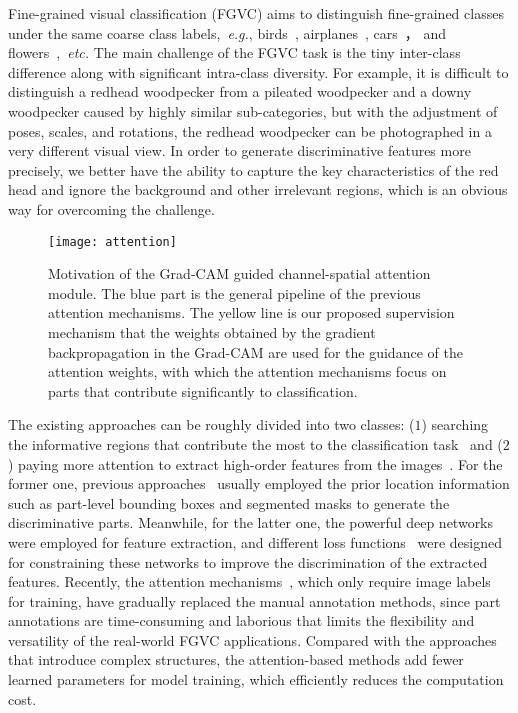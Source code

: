 \documentclass{article}
\begin{document}
Fine-grained visual classification (FGVC) aims to distinguish fine-grained classes under the same coarse class labels,~\emph{e.g.}, birds~\cite{birds}, airplanes~\cite{air}, cars~\cite{cars}， and flowers~\cite{flowers},~\emph{etc.} The main challenge of the FGVC task is the tiny inter-class difference along with significant intra-class diversity. For example, it is difficult to distinguish a redhead woodpecker from a pileated woodpecker and a downy woodpecker caused by highly similar sub-categories, but with the adjustment of poses, scales, and rotations, the redhead woodpecker can be photographed in a very different visual view. In order to generate discriminative features more precisely, we better have the ability to capture the key characteristics of the red head and ignore the background and other irrelevant regions, which is an obvious way for overcoming the challenge. 

\begin{figure}
	\centering 
	\texttt{[image: attention]}  
	\vspace{-6mm}
	\caption{Motivation of the Grad-CAM guided channel-spatial attention module. The blue part is the general pipeline of the previous attention mechanisms. The yellow line is our proposed supervision mechanism that the weights obtained by the gradient backpropagation in the Grad-CAM are used for the guidance of the attention weights, with which the attention mechanisms focus on parts that contribute significantly to classification.}\label{fig:attention}
	
\end{figure}


    The existing approaches can be roughly divided into two classes: ($1$) searching the informative regions that contribute the most to the classification task~\cite{anno,TASN,NTS} and ($2$) paying more attention to extract high-order features from the images~\cite{BP,BT,mamcloss,mc}. For the former one, previous approaches~\cite{anno} usually employed the prior location information such as part-level bounding boxes and segmented masks to generate the discriminative parts. Meanwhile, for the latter one, the powerful deep networks~\cite{BP,BT} were employed for feature extraction, and different loss functions~\cite{mamcloss,mc} were designed for constraining these networks to improve the discrimination of the extracted features. Recently, the attention mechanisms~\cite{SENet,MA-CNN,RA-CNN}, which only require image labels for training, have gradually replaced the   manual annotation methods, since part annotations are time-consuming and laborious that limits the flexibility and versatility of the real-world FGVC applications. Compared with the approaches that introduce complex structures, the attention-based methods add fewer learned parameters for model training, which efficiently reduces the computation cost.
\end{document}
